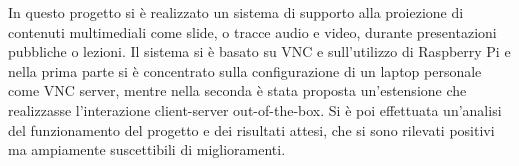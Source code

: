 In questo progetto si è realizzato un sistema di supporto alla proiezione di contenuti multimediali come slide, o tracce audio e video, durante presentazioni pubbliche o lezioni.
Il sistema si è basato su VNC e sull'utilizzo di Raspberry Pi e nella prima parte si è concentrato sulla configurazione di un laptop personale come VNC server, mentre nella seconda è stata proposta un'estensione che realizzasse l'interazione client-server out-of-the-box.
Si è poi effettuata un'analisi del funzionamento del progetto e dei risultati attesi, che si sono rilevati positivi ma ampiamente suscettibili di miglioramenti.

